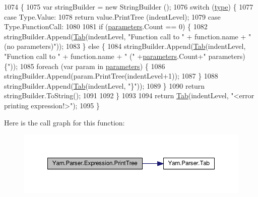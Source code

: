 \begin{DoxyCode}
1074             \{
1075                 var stringBuilder = \textcolor{keyword}{new} StringBuilder ();
1076                 \textcolor{keywordflow}{switch} (\hyperlink{a00098_ad55c92df835006328bc2a79a8f91efb9}{type}) \{
1077                 \textcolor{keywordflow}{case} Type.Value:
1078                     \textcolor{keywordflow}{return} value.PrintTree (indentLevel);
1079                 \textcolor{keywordflow}{case} Type.FunctionCall:
1080 
1081                     \textcolor{keywordflow}{if} (\hyperlink{a00098_a7b21380bead8ae08b2cfc6594edab32c}{parameters}.Count == 0) \{
1082                         stringBuilder.Append(\hyperlink{a00143_aa8fa36b46de12a1c561d77b99c4b9ae3}{Tab}(indentLevel, \textcolor{stringliteral}{"Function call to "} + \textcolor{keyword}{function}.name + \textcolor{stringliteral}{"
       (no parameters)"}));
1083                     \} \textcolor{keywordflow}{else} \{
1084                         stringBuilder.Append(\hyperlink{a00143_aa8fa36b46de12a1c561d77b99c4b9ae3}{Tab}(indentLevel, \textcolor{stringliteral}{"Function call to "} + \textcolor{keyword}{function}.name + \textcolor{stringliteral}{" ("}
       +\hyperlink{a00098_a7b21380bead8ae08b2cfc6594edab32c}{parameters}.Count+\textcolor{stringliteral}{" parameters) \{"}));
1085                         \textcolor{keywordflow}{foreach} (var param \textcolor{keywordflow}{in} \hyperlink{a00098_a7b21380bead8ae08b2cfc6594edab32c}{parameters}) \{
1086                             stringBuilder.Append(param.PrintTree(indentLevel+1));
1087                         \}
1088                         stringBuilder.Append(\hyperlink{a00143_aa8fa36b46de12a1c561d77b99c4b9ae3}{Tab}(indentLevel, \textcolor{stringliteral}{"\}"}));
1089                     \}
1090                     \textcolor{keywordflow}{return} stringBuilder.ToString();
1091 
1092                 \}
1093 
1094                 \textcolor{keywordflow}{return} \hyperlink{a00143_aa8fa36b46de12a1c561d77b99c4b9ae3}{Tab}(indentLevel, \textcolor{stringliteral}{"<error printing expression!>"});
1095             \}
\end{DoxyCode}


Here is the call graph for this function\-:
\nopagebreak
\begin{figure}[H]
\begin{center}
\leavevmode
\includegraphics[width=350pt]{a00098_a509ba6d93218203bae56a5a7a82e8261_cgraph}
\end{center}
\end{figure}


